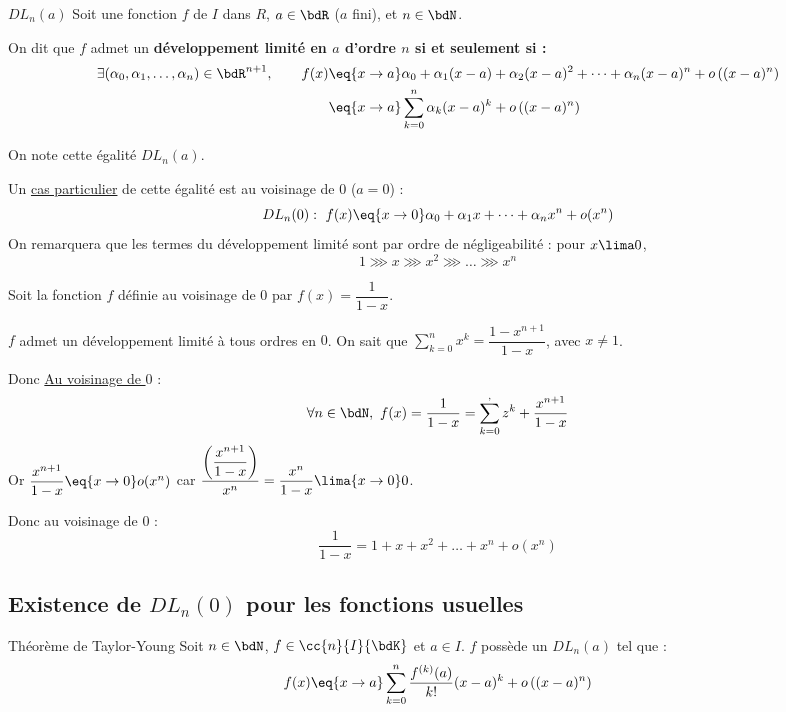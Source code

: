 \documentclass[a4paper,french,bookmarks]{article}
\begin{document}
\begin{definition}{$DL_n(a)$}{}
    Soit une fonction $f$ de $I$ dans $R$, $a \in \bdR$ ($a$ fini), et $n \in \bdN$.
    
    On dit que $f$ admet un \bf{développement limité en $a$ d'ordre $n$} si et seulement si :
    \begin{align*}
        \exists (\alpha_0, \alpha_1, \dots, \alpha_n) \in \bdR^{n+1},\qquad f(x) &\eq{x \to a} \alpha_0 +  \alpha_1(x-a) + \alpha_2(x-a)^2 + \dots + \alpha_n(x-a)^n + o\left((x-a)^n\right)\\
        &\eq{x \to a} \sum_{k=0}^n \alpha_k(x-a)^k + o\left((x-a)^n\right)
    \end{align*} 
\end{definition}
On note cette égalité $DL_n(a)$. 

Un \underline{cas particulier} de cette égalité est au voisinage de $0$ ($a = 0$) :
\[ DL_n(0): \ f(x) \eq{x \to 0} \alpha_0 + \alpha_1x + \dots + \alpha_nx^n + o(x^n)\]
On remarquera que les termes du développement limité sont par ordre de négligeabilité : pour $x \lima 0$,
\[ 1 \ggg x \ggg x^2 \ggg \dots \ggg x^n\]

\begin{example}{}{}
    Soit la fonction $f$ définie au voisinage de $0$ par $f(x) = \dfrac{1}{1-x}$.
    
    $f$ admet un développement limité à tous ordres en $0$.
    \tcblower
    On sait que $\displaystyle \sum_{k=0}^n x^k = \dfrac{1-x^{n+1}}{1-x}$, avec $x \neq 1$.
    
    Donc \underline{Au voisinage de $0$} :
    \[ \forall n \in \bdN,\ f(x) = \dfrac{1}{1-x} = \sum_{k=0}^, z^k + \dfrac{x^{n+1}}{1-x}\]
    Or $\dfrac{x^{n+1}}{1-x} \eq{x \to 0} o(x^n)$ car $\dfrac{\left(\dfrac{x^{n+1}}{1-x}\right)}{x^n} = \dfrac{x^n}{1-x} \lima{x \to 0} 0$.
    
    Donc au voisinage de $0$ :
    \[ \dfrac{1}{1-x} = 1 + x + x^2 + \dots + x^n + o(x^n)\]
\end{example}

\subsection{Existence de $DL_n(0)$ pour les fonctions usuelles}

\begin{theorem}{Théorème de Taylor-Young}{}
    Soit $n \in \bdN$, $f \in \cc{n}{I}{\bdK}$ et $a \in I$. $f$ possède un $DL_n(a)$ tel que :
    \[ f(x) \eq{x \to a} \sum_{k=0}^n \dfrac{f^{(k)}(a)}{k!}(x-a)^k + o\left((x-a)^n\right)\]
\end{theorem}
\end{document}
